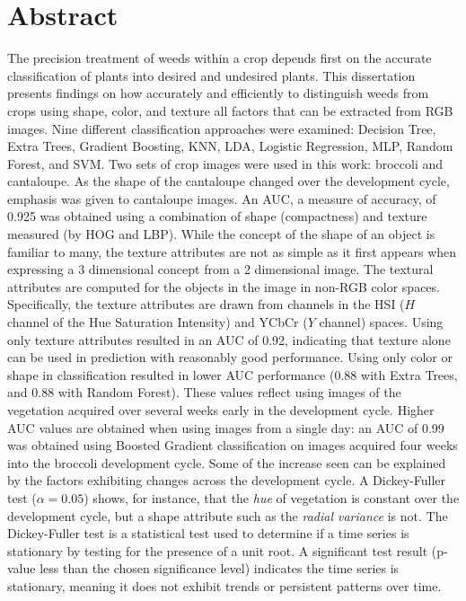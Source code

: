 \documentclass[letterpaper]{report}
\begin{document}
\tableofcontents
\listoffigures
\listoftables
\listofmyequations

\clearpage
\setlength{\glsdescwidth}{0.95\linewidth}

\printglossary[type=acronym]

\newpage

\section*{Abstract}
The precision treatment of weeds within a crop depends first on the accurate classification of plants into desired and undesired plants. This dissertation presents findings on how accurately and efficiently to distinguish weeds from crops using shape, color, and texture all factors that can be extracted from RGB images.  Nine different classification approaches were examined: Decision Tree, Extra Trees, Gradient Boosting, \gls{KNN}, \gls{LDA}, Logistic Regression, \gls{MLP}, Random Forest, and \gls{SVM}. Two sets of crop images were used in  this work: broccoli and cantaloupe. As the shape of the cantaloupe changed over the development cycle, emphasis was given to cantaloupe images. An \gls{AUC}, a measure of accuracy, of 0.925 was obtained using a combination of shape (compactness) and texture measured (by \gls{HOG} and \gls{LBP}).  While the concept of the shape of an object is familiar to many, the texture attributes are not as simple as it first appears when expressing a 3 dimensional concept from a 2 dimensional image. The textural attributes are computed for the objects in the image in non-RGB color spaces. Specifically, the texture attributes are drawn from channels in the \gls{HSI} ($H$ channel of the Hue Saturation Intensity) and YCbCr ($Y$ channel) spaces. Using only texture attributes resulted in an AUC of 0.92, indicating that texture alone can be used in prediction with reasonably good performance. Using only color or shape in classification resulted in lower AUC performance ($0.88$ with Extra Trees, and $0.88$ with Random Forest). These values reflect using images of the vegetation acquired over several weeks early in the development cycle. Higher AUC values are obtained when using images from a single day: an AUC of 0.99 was obtained using Boosted Gradient classification on images acquired four weeks into the broccoli development cycle. Some of the increase seen can be explained by the factors exhibiting changes across the development cycle. A Dickey-Fuller test ($\alpha = 0.05$) shows, for instance, that the \textit{hue} of vegetation is constant over the development cycle, but a shape attribute such as the \textit{radial variance} is not. The Dickey-Fuller test is a statistical test used to determine if a time series is stationary by testing for the presence of a unit root. A significant test result (p-value less than the chosen significance level) indicates the time series is stationary, meaning it does not exhibit trends or persistent patterns over time.
\end{document}
